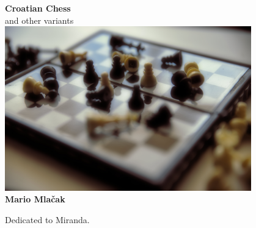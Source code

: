 \documentclass[a5paper,12pt]{book} %
\begin{document}
\setlength{\floatsep}{0.2\baselineskip} %
\setlength{\textfloatsep}{1.0\baselineskip} %
\setlength{\intextsep}{0.2\baselineskip}

\begin{titlepage}
\begin{center} %
    \hspace{2.5mm} \textbf{\huge{Croatian Chess}} \\ [1.0em]
    \hspace{2.5mm} \large{and other variants} \\ [2.0cm]

    \hspace{2.5mm} \includegraphics[width=0.8\textwidth, keepaspectratio=true]{crochess.jpg} \\ [2.0cm]

    \hspace{2.5mm} \textbf{\large{Mario Mlačak}} \\ [2.0cm]
\end{center} %
\end{titlepage}

\thispagestyle{empty}
\vspace*{0.1\textheight}
\clearpage %

\thispagestyle{empty}
\vspace*{0.2\textheight}
\hfill{Dedicated to Miranda.}
\clearpage %
\end{document}
